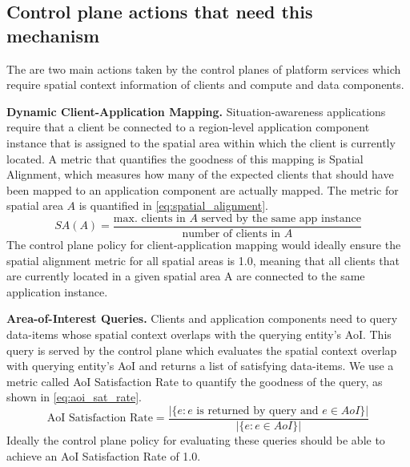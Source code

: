 \subsection{Control plane actions that need this mechanism}
The are two main actions taken by the control planes of platform services which require spatial context information of clients and compute and data components.
\par \noindent \textbf{Dynamic Client-Application Mapping. } Situation-awareness applications require that a client be connected to a region-level application component instance that is assigned to the spatial area within which the client is currently located. A metric that quantifies the goodness of this mapping is Spatial Alignment, which measures how many of the expected clients that should have been mapped to an application component are actually mapped. The metric for spatial area $A$ is quantified in \cref{eq:spatial_alignment}.
\begin{equation}
SA \left( A \right) = \dfrac{\text{max. clients in }A\text{ served by the same app instance}}{\text{number of clients in }A}
\label{eq:spatial_alignment}
\end{equation}
The control plane policy for client-application mapping would ideally ensure the spatial alignment metric for all spatial areas is 1.0, meaning that all clients that are currently located in a given spatial area A are connected to the same application instance.

\par \noindent \textbf{Area-of-Interest Queries. } Clients and application components need to query data-items whose spatial context overlaps with the querying entity's AoI. This query is served by the control plane which evaluates the spatial context overlap with querying entity's AoI and returns a list of satisfying data-items. We use a metric called AoI Satisfaction Rate to quantify the goodness of the query, as shown in \cref{eq:aoi_sat_rate}.
\begin{equation}
\text{AoI Satisfaction Rate} = \dfrac{|\{ e: e \text{ is returned by query  and } e \in AoI \}|}{|\{ e: e \in AoI \}|}
\label{eq:aoi_sat_rate}
\end{equation}
Ideally the control plane policy for evaluating these queries should be able to achieve an AoI Satisfaction Rate of 1.0.


